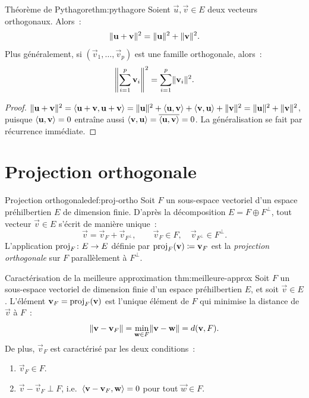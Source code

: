\begin{theorem}{Théorème de Pythagore}{thm:pythagore}
  Soient $\vec{u},\vec{v}\in E$ deux vecteurs orthogonaux. Alors~:
  \[
    \norm{\vec{u}+\vec{v}}^2=\norm{\vec{u}}^2+\norm{\vec{v}}^2.
  \]
  Plus généralement, si $(\vec{v}_1,\ldots,\vec{v}_p)$ est une famille
  orthogonale, alors~:
  \[
    \norm*{\sum_{i=1}^p\vec{v}_i}^2=\sum_{i=1}^p\norm{\vec{v}_i}^2.
  \]
\end{theorem}

\begin{proof}
  $\norm{\vec{u}+\vec{v}}^2
  =\inner{\vec{u}+\vec{v},\vec{u}+\vec{v}}
  =\norm{\vec{u}}^2+\inner{\vec{u},\vec{v}}
  +\inner{\vec{v},\vec{u}}+\norm{\vec{v}}^2
  =\norm{\vec{u}}^2+\norm{\vec{v}}^2$,
  puisque $\inner{\vec{u},\vec{v}}=0$ entraîne aussi
  $\inner{\vec{v},\vec{u}}=\overline{\inner{\vec{u},\vec{v}}}=0$.
  La généralisation se fait par récurrence immédiate.
\end{proof}

\section{Projection orthogonale}\label{sec:projection-orthogonale}

\begin{definition}{Projection orthogonale}{def:proj-ortho}
  Soit $F$ un sous-espace vectoriel d'un espace préhilbertien $E$ de
  dimension finie. D'après la décomposition $E=F\oplus F^\perp$, tout
  vecteur $\vec{v}\in E$ s'écrit de manière unique~:
  \[
    \vec{v}=\vec{v}_F+\vec{v}_{F^\perp},\qquad
    \vec{v}_F\in F,\quad\vec{v}_{F^\perp}\in F^\perp.
  \]
  L'application $\proj_F\colon E\to E$ définie par
  $\proj_F(\vec{v})\deff\vec{v}_F$ est la \emph{projection orthogonale}
  sur $F$ parallèlement à $F^\perp$.
\end{definition}

\begin{theorem}{Caractérisation de la meilleure approximation}%
{thm:meilleure-approx}
  Soit $F$ un sous-espace vectoriel de dimension finie d'un espace
  préhilbertien $E$, et soit $\vec{v}\in E$. L'élément
  $\vec{v}_F=\proj_F(\vec{v})$ est l'unique élément de $F$ qui
  minimise la distance de $\vec{v}$ à $F$~:
  \[
    \norm{\vec{v}-\vec{v}_F}
    =\min_{\vec{w}\in F}\norm{\vec{v}-\vec{w}}
    =d(\vec{v},F).
  \]
  De plus, $\vec{v}_F$ est caractérisé par les deux conditions~:
  \begin{enumerate}[label=(\roman*)]
    \item $\vec{v}_F\in F$.
    \item $\vec{v}-\vec{v}_F\perp F$, i.e.\
      $\inner{\vec{v}-\vec{v}_F,\vec{w}}=0$ pour tout $\vec{w}\in F$.
  \end{enumerate}
\end{theorem}


